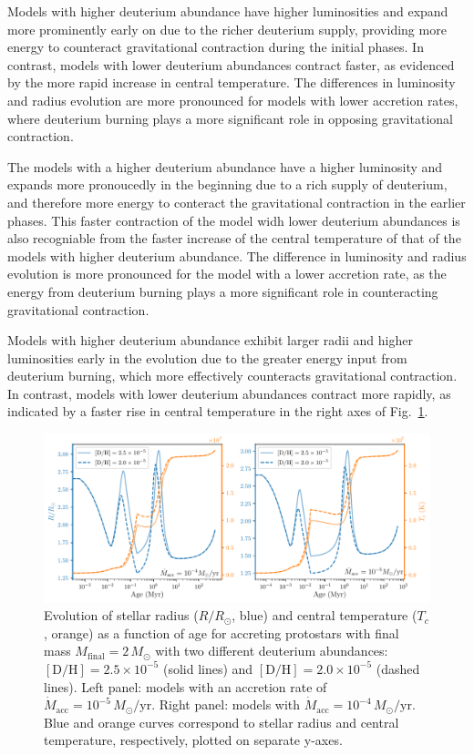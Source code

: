 \documentclass[12pt,a4paper]{article}
\newcommand{\mr}{\mathrm}
\begin{document}
Models with higher deuterium abundance have higher luminosities and expand more prominently early on due to the richer deuterium supply, providing more energy to counteract gravitational contraction during the initial phases. In contrast, models with lower deuterium abundances contract faster, as evidenced by the more rapid increase in central temperature. The differences in luminosity and radius evolution are more pronounced for models with lower accretion rates, where deuterium burning plays a more significant role in opposing gravitational contraction.

The models with a higher deuterium abundance have a higher luminosity and expands more pronoucedly in the beginning due to a rich supply of deuterium, and therefore more energy to conteract the gravitational contraction in the earlier phases. This faster contraction of the model widh lower deuterium abundances is also recogniable from the faster increase of the central temperature of that of the models with higher deuterium abundance. The difference in luminosity and radius evolution is more pronounced for the model with a lower accretion rate, as the energy from deuterium burning plays a more significant role in counteracting gravitational contraction.

Models with higher deuterium abundance exhibit larger radii and higher luminosities early in the evolution due to the greater energy input from deuterium burning, which more effectively counteracts gravitational contraction. In contrast, models with lower deuterium abundances contract more rapidly, as indicated by a faster rise in central temperature in the right axes of Fig.~\ref{fig:comp_deuterium_radius_tc}. 

\begin{figure}
  \centering
  \includegraphics[width=.98\textwidth,keepaspectratio]{cmp_deuterium_radius_tc.pdf}
  \caption{Evolution of stellar radius ($R/R_\odot$, blue) and central temperature ($T_c$, orange) as a function of age for accreting protostars with final mass $M_\mr{final} = 2\,M_\odot$ with two different deuterium abundances: $[\mr{D/H}] = 2.5 \times 10^{-5}$ (solid lines) and $[\mr{D/H}] = 2.0 \times 10^{-5}$ (dashed lines). Left panel: models with an accretion rate of $\dot{M}_\mr{acc} = 10^{-5}\,M_\odot/\mr{yr}$. Right panel: models with $\dot{M}_\mr{acc} = 10^{-4}\,M_\odot/\mr{yr}$. Blue and orange curves correspond to stellar radius and central temperature, respectively, plotted on separate y-axes.}
  \label{fig:comp_deuterium_radius_tc}
\end{figure}
\end{document}
